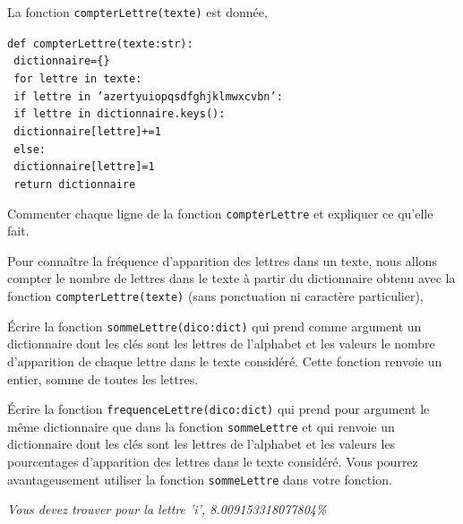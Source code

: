 \documentclass[t,10pt]{article}
\begin{document}
La fonction \texttt{compterLettre(texte)} est donnée,
\begin{python}
\texttt{def compterLettre(texte:str):\\
{}\ \indente dictionnaire=\{\}\\
\ \indente  for lettre in texte:\\
\ \indente \indente        if lettre in 'azertyuiopqsdfghjklmwxcvbn':\\
\ \indente \indente \indente     if lettre in dictionnaire.keys():\\
\ \indente \indente \indente  \indente   dictionnaire[lettre]+=1\\
\ \indente \indente \indente else:\\
\ \indente \indente \indente  \indente  dictionnaire[lettre]=1\\
\ \indente    return dictionnaire}
\end{python}

\setcounter{cexo}{0}

\begin{qexo}
Commenter chaque ligne de la fonction \texttt{compterLettre} et expliquer ce qu'elle fait.
\end{qexo}

Pour connaître la fréquence d'apparition des lettres dans un texte, nous allons compter le nombre de lettres dans le texte à partir du dictionnaire obtenu avec la fonction \texttt{compterLettre(texte)} (sans ponctuation ni caractère particulier),

\begin{qexo}
\'Ecrire la fonction \texttt{sommeLettre(dico:dict)} qui prend comme argument un dictionnaire dont les clés sont les lettres de l'alphabet et les valeurs le nombre d'apparition de chaque lettre dans le texte considéré. Cette fonction renvoie un entier, somme de toutes les lettres.
\end{qexo}

\begin{qexo}
\'Ecrire la fonction \texttt{frequenceLettre(dico:dict)} qui prend pour argument le même dictionnaire que dans la fonction \texttt{sommeLettre} et qui renvoie un dictionnaire dont les clés sont les lettres de l'alphabet et les valeurs les pourcentages d'apparition des lettres dans le texte considéré. Vous pourrez avantageusement utiliser la fonction \texttt{sommeLettre} dans votre fonction.
\end{qexo}

\textit{Vous devez trouver pour la lettre 'i', 8.009153318077804\%}
\end{document}
